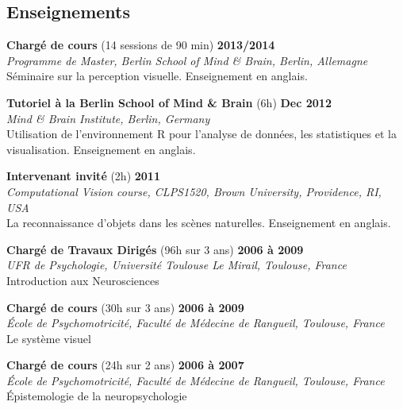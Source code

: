 \documentclass[margin,line]{resume}
\begin{document}
\begin{resume}
    
\newpage

\vspace{3mm}
\section{\mysidestyle Enseignements}
	
	\textbf{Chargé de cours} (14 sessions de 90 min) \hfill \textbf{2013/2014}\\
	\textsl{Programme de Master, Berlin School of Mind \& Brain, Berlin, Allemagne}\\
	Séminaire sur la perception visuelle. Enseignement en anglais.
	
	\vspace{-2mm}
	\textbf{Tutoriel à la Berlin School of Mind \& Brain} (6h) \hfill \textbf{Dec 2012}\\
	\textsl{Mind \& Brain Institute, Berlin, Germany}\\
	Utilisation de l'environnement R pour l'analyse de données, les statistiques et la visualisation.  Enseignement en anglais.

	\vspace{-2mm} 
	\textbf{Intervenant invité} (2h) \hfill \textbf{2011}\\
	\textsl{Computational Vision course, CLPS1520, Brown University, Providence, RI, USA}\\
	La reconnaissance d'objets dans les scènes naturelles. Enseignement en anglais.

	\vspace{-2mm} 
	\textbf{Chargé de Travaux Dirigés} (96h sur 3 ans) \hfill \textbf{2006 à 2009}\\
	\textsl{UFR de Psychologie, Université Toulouse Le Mirail, Toulouse, France}\\
	Introduction aux Neurosciences	

	\vspace{-2mm} 
	\textbf{Chargé de cours} (30h sur 3 ans) \hfill \textbf{2006 à 2009}\\
	\textsl{\'Ecole de Psychomotricité, Faculté de Médecine de Rangueil, Toulouse, France}\\
	Le système visuel 
	
	\vspace{-2mm} 
	\textbf{Chargé de cours} (24h sur 2 ans) \hfill \textbf{2006 à 2007}\\
	\textsl{\'Ecole de Psychomotricité, Faculté de Médecine de Rangueil, Toulouse, France}\\
	\'Epistemologie de la neuropsychologie


\end{resume}
\end{document}
